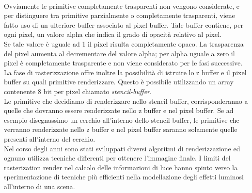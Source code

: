 \\
Ovviamente le primitive completamente trasparenti non vengono considerate, e per  distinguere tra primitive parzialmente o completamente trasparenti, viene fatto uso di un ulteriore buffer associato al pixel buffer. Tale buffer contiene, per ogni pixel, un valore alpha che indica il grado di opacità relativo al pixel. 
\\
Se tale valore è uguale ad 1 il pixel risulta completamente opaco. La trasparenza del pixel aumenta al decrementare del valore alpha; per alpha uguale a zero il pixel è completamente trasparente e non viene considerato per le fasi successive.
\\
La fase di rasterizzazione offre inoltre la possibilità di istruire lo z buffer e il pixel buffer su quali primitive renderizzare. Questo è possibile utilizzando un array contenente 8 bit per pixel chiamato \emph{stencil-buffer}. 
\\
Le primitive che decidiamo di renderizzare nello stencil buffer, corrisponderanno a quelle che dovranno essere renderizzate nello z buffer e nel pixel buffer. Se ad esempio disegnassimo un cerchio all’interno dello stencil buffer, le primitive che verranno renderizzate nello z buffer e nel pixel buffer saranno solamente quelle presenti all’interno del cerchio.
\\
Nel corso degli anni sono stati sviluppati diversi algoritmi di renderizzazione ed ognuno utilizza tecniche differenti per ottenere l’immagine finale. I limiti del rasterization render nel calcolo delle informazioni di luce hanno spinto verso la sperimentazione di tecniche più efficienti nella modellazione degli effetti luminosi all’interno di una scena.